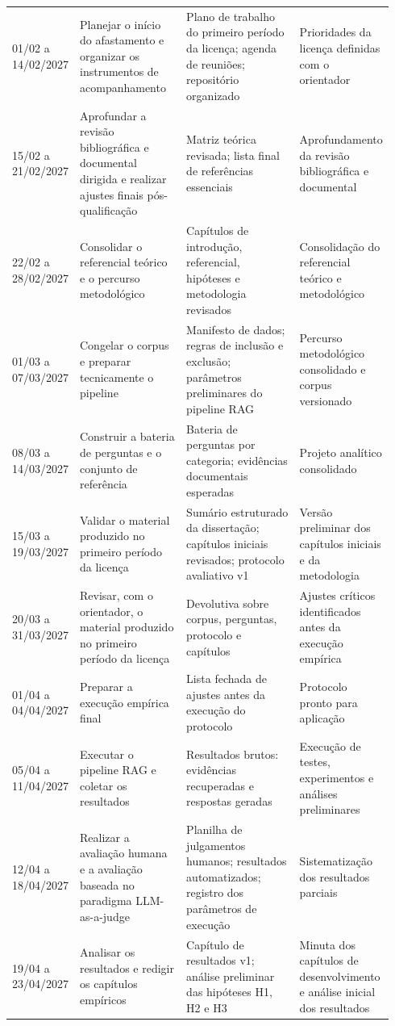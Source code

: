 \begin{landscape}
\begin{longtable}{p{0.12\linewidth}p{0.28\linewidth}p{0.30\linewidth}p{0.24\linewidth}}
01/02 a 14/02/2027 & Planejar o início do afastamento e organizar os instrumentos de acompanhamento & Plano de trabalho do primeiro período da licença; agenda de reuniões; repositório organizado & Prioridades da licença definidas com o orientador \\
15/02 a 21/02/2027 & Aprofundar a revisão bibliográfica e documental dirigida e realizar ajustes finais pós-qualificação & Matriz teórica revisada; lista final de referências essenciais & Aprofundamento da revisão bibliográfica e documental \\
22/02 a 28/02/2027 & Consolidar o referencial teórico e o percurso metodológico & Capítulos de introdução, referencial, hipóteses e metodologia revisados & Consolidação do referencial teórico e metodológico \\
01/03 a 07/03/2027 & Congelar o corpus e preparar tecnicamente o pipeline & Manifesto de dados; regras de inclusão e exclusão; parâmetros preliminares do pipeline RAG & Percurso metodológico consolidado e corpus versionado \\
08/03 a 14/03/2027 & Construir a bateria de perguntas e o conjunto de referência & Bateria de perguntas por categoria; evidências documentais esperadas & Projeto analítico consolidado \\
15/03 a 19/03/2027 & Validar o material produzido no primeiro período da licença & Sumário estruturado da dissertação; capítulos iniciais revisados; protocolo avaliativo v1 & Versão preliminar dos capítulos iniciais e da metodologia \\
20/03 a 31/03/2027 & Revisar, com o orientador, o material produzido no primeiro período da licença & Devolutiva sobre corpus, perguntas, protocolo e capítulos & Ajustes críticos identificados antes da execução empírica \\
01/04 a 04/04/2027 & Preparar a execução empírica final & Lista fechada de ajustes antes da execução do protocolo & Protocolo pronto para aplicação \\
05/04 a 11/04/2027 & Executar o pipeline RAG e coletar os resultados & Resultados brutos: evidências recuperadas e respostas geradas & Execução de testes, experimentos e análises preliminares \\
12/04 a 18/04/2027 & Realizar a avaliação humana e a avaliação baseada no paradigma LLM-as-a-judge & Planilha de julgamentos humanos; resultados automatizados; registro dos parâmetros de execução & Sistematização dos resultados parciais \\
19/04 a 23/04/2027 & Analisar os resultados e redigir os capítulos empíricos & Capítulo de resultados v1; análise preliminar das hipóteses H1, H2 e H3 & Minuta dos capítulos de desenvolvimento e análise inicial dos resultados \\

\end{longtable}
\end{landscape}
